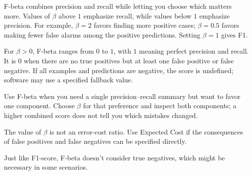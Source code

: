 \metricend
\clearpage
\thispagestyle{classificationstyle}
\label{sec:f-beta}

F-beta combines precision and recall while letting you choose which matters more. Values of $\beta$ above $1$ emphasize recall, while values below $1$ emphasize precision. For example, $\beta = 2$ favors finding more positive cases; $\beta = 0.5$ favors making fewer false alarms among the positive predictions. Setting $\beta = 1$ gives F1.

\begin{metricformula}
\end{metricformula}

For $\beta > 0$, F-beta ranges from $0$ to $1$, with $1$ meaning perfect precision and recall. It is $0$ when there are no true positives but at least one false positive or false negative. If all examples and predictions are negative, the score is undefined; software may use a specified fallback value.


Use F-beta when you need a single precision--recall summary but want to favor one component. Choose $\beta$ for that preference and inspect both components; a higher combined score does not tell you which mistakes changed.

{
\item The value of $\beta$ is not an error-cost ratio. Use Expected Cost if the consequences of false positives and false negatives can be specified directly.
\item Just like F1-score, F-beta doesn't consider true negatives, which might be necessary in some scenarios.
}


